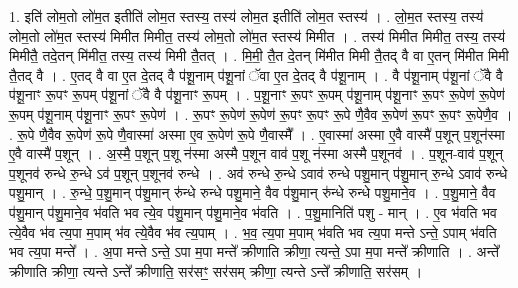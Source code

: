 \documentclass[17pt]{extarticle}
\begin{document}
1. इति॑ लोम॒तो लो॑म॒त इतीति॑ लोम॒त स्तस्य॒ तस्य॑ लोम॒त इतीति॑ लोम॒त स्तस्य॑ । . लो॒म॒त स्तस्य॒ तस्य॑ लोम॒तो लो॑म॒त स्तस्य॑ मिमीत मिमीत॒ तस्य॑ लोम॒तो लो॑म॒त स्तस्य॑ मिमीत । . तस्य॑ मिमीत मिमीत॒ तस्य॒ तस्य॑ मिमीतै॒ तदे॒तन् मि॑मीत॒ तस्य॒ तस्य॑ मिमी तै॒तत् । . मि॒मी॒ तै॒त दे॒तन् मि॑मीत मिमी तै॒तद् वै वा ए॒तन् मि॑मीत मिमी तै॒तद् वै । . ए॒तद् वै वा ए॒त दे॒तद् वै प॑शू॒नाम् प॑शू॒नां ॅवा ए॒त दे॒तद् वै प॑शू॒नाम् । . वै प॑शू॒नाम् प॑शू॒नां ॅवै वै प॑शू॒नाꣳ रू॒पꣳ रू॒पम् प॑शू॒नां ॅवै वै प॑शू॒नाꣳ रू॒पम् । . प॒शू॒नाꣳ रू॒पꣳ रू॒पम् प॑शू॒नाम् प॑शू॒नाꣳ रू॒पꣳ रू॒पेण॑ रू॒पेण॑ रू॒पम् प॑शू॒नाम् प॑शू॒नाꣳ रू॒पꣳ रू॒पेण॑ । . रू॒पꣳ रू॒पेण॑ रू॒पेण॑ रू॒पꣳ रू॒पꣳ रू॒पे णै॒वैव रू॒पेण॑ रू॒पꣳ रू॒पꣳ रू॒पेणै॒व । . रू॒पे णै॒वैव रू॒पेण॑ रू॒पे णै॒वास्मा॑ अस्मा ए॒व रू॒पेण॑ रू॒पे णै॒वास्मै᳚ । . ए॒वास्मा॑ अस्मा ए॒वै वास्मै॑ प॒शून् प॒शून॑स्मा ए॒वै वास्मै॑ प॒शून् । . अ॒स्मै॒ प॒शून् प॒शू न॑स्मा अस्मै प॒शून वाव॑ प॒शू न॑स्मा अस्मै प॒शूनव॑ । . प॒शून-वाव॑ प॒शून् प॒शूनव॑ रुन्धे रु॒न्धे ऽव॑ प॒शून् प॒शूनव॑ रुन्धे । . अव॑ रुन्धे रु॒न्धे ऽवाव॑ रुन्धे पशु॒मान् प॑शु॒मान् रु॒न्धे ऽवाव॑ रुन्धे पशु॒मान् । . रु॒न्धे॒ प॒शु॒मान् प॑शु॒मान् रु॑न्धे रुन्धे पशु॒माने॒ वैव प॑शु॒मान् रु॑न्धे रुन्धे पशु॒माने॒व । . प॒शु॒माने॒ वैव प॑शु॒मान् प॑शु॒माने॒व भ॑वति भव त्ये॒व प॑शु॒मान् प॑शु॒माने॒व भ॑वति । . प॒शु॒मानिति॑ पशु - मान् । . ए॒व भ॑वति भव त्ये॒वैव भ॑व त्य॒पा म॒पाम् भ॑व त्ये॒वैव भ॑व त्य॒पाम् । . भ॒व॒ त्य॒पा म॒पाम् भ॑वति भव त्य॒पा मन्ते ऽन्ते॒ ऽपाम् भ॑वति भव त्य॒पा मन्ते᳚ । . अ॒पा मन्ते ऽन्ते॒ ऽपा म॒पा मन्ते᳚ क्रीणाति क्रीणा॒ त्यन्ते॒ ऽपा म॒पा मन्ते᳚ क्रीणाति । . अन्ते᳚ क्रीणाति क्रीणा॒ त्यन्ते ऽन्ते᳚ क्रीणाति॒ सर॑सꣳ॒॒ सर॑सम् क्रीणा॒ त्यन्ते ऽन्ते᳚ क्रीणाति॒ सर॑सम् । \newline
\end{document}
